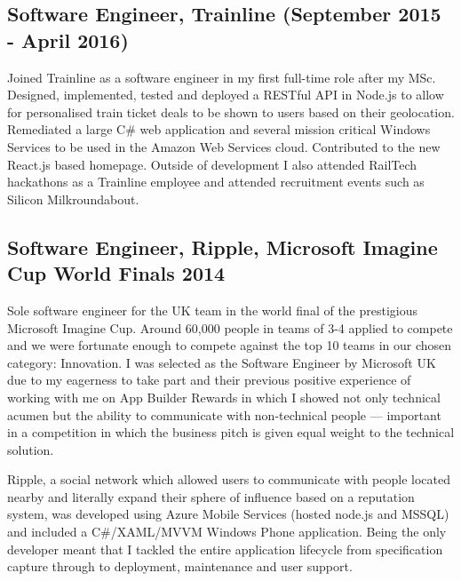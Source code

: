 \documentclass[10pt,letterpaper]{article}
\begin{document}
	\subsection*{Software Engineer, Trainline \small{(September 2015 - April 2016)}}
	Joined Trainline as a software engineer in my first full-time role after my MSc. Designed, implemented, tested and deployed a RESTful API in Node.js to allow for personalised train ticket deals to be shown to users based on their geolocation. Remediated a large C\# web application and several mission critical Windows Services to be used in the Amazon Web Services cloud. Contributed to the new React.js based homepage. Outside of development I also attended RailTech hackathons as a Trainline employee and attended recruitment events such as Silicon Milkroundabout.
	
	\subsection*{Software Engineer, Ripple, Microsoft Imagine Cup World Finals 2014}
	Sole software engineer for the UK team in the world final of the prestigious Microsoft Imagine Cup. Around 60,000 people in teams of 3-4 applied to compete and we were fortunate enough to compete against the top 10 teams in our chosen category: Innovation. I was selected as the Software Engineer by Microsoft UK due to my eagerness to take part and their previous positive experience of working with me on App Builder Rewards in which I showed not only technical acumen but the ability to communicate with non-technical people — important in a competition in which the business pitch is given equal weight to the technical solution.

	Ripple, a social network which allowed users to communicate with people located nearby and literally expand their sphere of influence based on a reputation system, was developed using Azure Mobile Services (hosted node.js and MSSQL) and included a C\#/XAML/MVVM Windows Phone application. Being the only developer meant that I tackled the entire application lifecycle from specification capture through to deployment, maintenance and user support.
\end{document}

